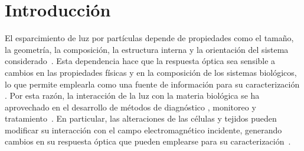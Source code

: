 
\chapter*{Introducción}
\label{chapter:intro}


El esparcimiento de luz por partículas depende de propiedades como el tamaño, la geometría, la composición, la estructura interna y la orientación del sistema considerado~\cite{bohrenAbsorptionScatteringLight2008, altugReviewBiosensors2022, yunReviewDiagnosis2017}. Esta dependencia hace que la respuesta óptica sea sensible a cambios en las propiedades físicas y en la composición de los sistemas biológicos, lo que permite emplearla como una fuente de información para su caracterización \cite{giengerRefractiveIndexBlood2019}. Por esta razón, la interacción de la luz con la materia biológica se ha aprovechado en el desarrollo de métodos de diagnóstico \cite{duanLabelFreeHematology2022, yunReviewDiagnosis2017}, monitoreo \cite{vairaperumalBiosensorPoC2023, duyBiosensorsNeurodegenerative2025} y tratamiento~\cite{baldiniShiningLightFuture2025, leeEndoscopeNPstheranostic2015}. En particular, las alteraciones de las células y tejidos pueden modificar su interacción con el campo electromagnético incidente, generando cambios en su respuesta óptica que pueden emplearse para su caracterización~\cite{baldiniShiningLightFuture2025}.


